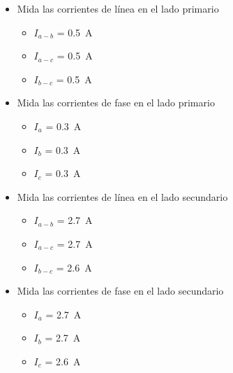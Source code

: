 \documentclass[12pt,a4paper]{article}
\begin{document}
\begin{enumerate}
\begin{itemize}
\begin{itemize}
            \item $V_{a}$ = \SI{21.80}{\volt}
            \item $V_{b}$ = \SI{22.09}{\volt}
            \item $V_{c}$ = \SI{21.84}{\volt}
        \end{itemize}
        \item Mida las corrientes de línea en el lado primario
        \begin{itemize}
            \item $I_{a-b}$ = \SI{0.5}{\ampere}
            \item $I_{a-c}$ = \SI{0.5}{\ampere}
            \item $I_{b-c}$ = \SI{0.5}{\ampere}
        \end{itemize}
        \item Mida las corrientes de fase en el lado primario
        \begin{itemize}
            \item $I_{a}$ = \SI{0.3}{\ampere}
            \item $I_{b}$ = \SI{0.3}{\ampere}
            \item $I_{c}$ = \SI{0.3}{\ampere}
        \end{itemize}
        \item Mida las corrientes de línea en el lado secundario
        \begin{itemize}
            \item $I_{a-b}$ = \SI{2.7}{\ampere}
            \item $I_{a-c}$ = \SI{2.7}{\ampere}
            \item $I_{b-c}$ = \SI{2.6}{\ampere}
        \end{itemize}
        \item Mida las corrientes de fase en el lado secundario
        \begin{itemize}
            \item $I_{a}$ = \SI{2.7}{\ampere}
            \item $I_{b}$ = \SI{2.7}{\ampere}
            \item $I_{c}$ = \SI{2.6}{\ampere}
        \end{itemize}
    \end{itemize}
\end{enumerate}
\end{document}
